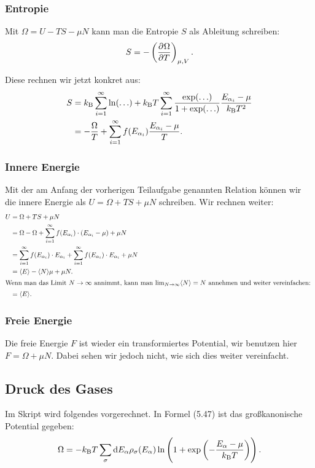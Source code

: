 \subsubsection{Entropie}

Mit $\Omega = U - TS - \mu N$ kann man die Entropie $S$ als Ableitung schreiben:
\[
    S = - \tdpd\Omega T{\mu, V}.
\]

Diese rechnen wir jetzt konkret aus:
\begin{align*}
    S &= k_\text B \sum_{i=1}^\infty \ln(\ldots) + k_\text B T \sum_{i=1}^\infty \frac{\exp(\ldots)}{1 + \exp(\ldots)} \frac{E_{\alpha_i} - \mu}{k_\text B T^2} \\
      &= - \frac\Omega T + \sum_{i=1}^\infty f(E_{\alpha_i}) \frac{E_{\alpha_i} - \mu}T.
\end{align*}

\subsubsection{Innere Energie}

Mit der am Anfang der vorherigen Teilaufgabe genannten Relation können wir die innere Energie als $U = \Omega + TS + \mu N$ schreiben. Wir rechnen weiter:
\begin{align*}
    U &= \Omega + TS + \mu N \\
      &= \Omega - \Omega + \isum f(\Eai) \cdot (\Eai - \mu) + \mu N \\
      &= \isum f(\Eai) \cdot \Eai + \isum f(\Eai) \cdot \Eai + \mu N \\
      &= \bracket E - \bracket N \mu + \mu N. \\
    \intertext{%
        Wenn man das Limit $N \to \infty$ annimmt, kann man $\lim_{N\to\infty}
        \bracket N = N$ annehmen und weiter vereinfachen:
    }
      &= \bracket E.
\end{align*}

\subsubsection{Freie Energie}

Die freie Energie $F$ ist wieder ein transformiertes Potential, wir benutzen
hier $F = \Omega + \mu N$. Dabei sehen wir jedoch nicht, wie sich dies weiter
vereinfacht.

\subsection{Druck des Gases}

Im Skript wird folgendes vorgerechnet. In Formel (5.47) ist das großkanonische Potential gegeben:
\[
    \Omega = - \kB T \sum_\sigma \dif E_\alpha \rho_\sigma(E_\alpha) \ln\del{1 + \exp\del{- \frac{E_\alpha - \mu}{\kB T}}}.
\]

